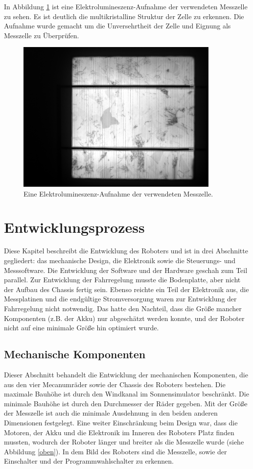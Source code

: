 \documentclass[a4paper,bibtotoc,oneside]{scrbook}
\begin{document}
\noindent In Abbildung \ref{el} ist eine Elektrolumineszenz-Aufnahme der verwendeten Messzelle zu sehen. Es ist deutlich die multikristalline Struktur der Zelle zu erkennen. Die Aufnahme wurde gemacht um die Unversehrtheit der Zelle und Eignung als Messzelle zu Überprüfen. 

\begin{figure}[htbp]
\centering
\includegraphics[width=100mm]{img/el.png}
\caption{Eine Elektrolumineszenz-Aufnahme der verwendeten Messzelle.}\label{el}
\end{figure}

\chapter{Entwicklungsprozess}\thispagestyle{empty}

Diese Kapitel beschreibt die Entwicklung des Roboters und ist in drei Abschnitte gegliedert: das mechanische Design, die Elektronik sowie die Steuerungs- und Messsoftware.
Die Entwicklung der Software und der Hardware geschah zum Teil parallel. Zur Entwicklung der Fahrregelung musste die Bodenplatte, aber nicht der Aufbau des Chassis fertig sein. Ebenso reichte ein Teil der Elektronik aus, die Messplatinen und die endgültige Stromversorgung waren zur Entwicklung der Fahrregelung nicht notwendig. Das hatte den Nachteil, dass die Größe mancher Komponenten (z.B. der Akku) nur abgeschätzt werden konnte, und der Roboter nicht auf eine minimale Größe hin optimiert wurde.

\section{Mechanische Komponenten}\thispagestyle{empty}

Dieser Abschnitt behandelt die Entwicklung der mechanischen Komponenten, die aus den vier Mecanumräder sowie der Chassis des Roboters bestehen. Die maximale Bauhöhe ist durch den Windkanal im Sonnensimulator beschränkt. Die minimale Bauhöhe ist durch den Durchmesser der Räder gegeben.
Mit der Größe der Messzelle ist auch die minimale Ausdehnung in den beiden anderen Dimensionen festgelegt. Eine weiter Einschränkung beim Design war, dass die Motoren, der Akku und die Elektronik im Inneren des Roboters Platz finden mussten, wodurch der Roboter länger und breiter als die Messzelle wurde (siehe Abbildung \ref{oben}). In dem Bild des Roboters sind die Messzelle, sowie der Einschalter und der Programmwahlschalter zu erkennen.
\end{document}
